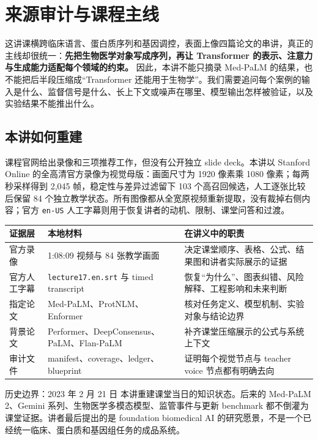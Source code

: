 \documentclass[a4paper]{article}
\begin{document}
\makecscover

\section{来源审计与课程主线}

这讲课横跨临床语言、蛋白质序列和基因调控，表面上像四篇论文的串讲，真正的主线却很统一：\textbf{先把生物医学对象写成序列，再让 Transformer 的表示、注意力与生成能力适配每个领域的约束。} 因此，本讲不能只摘录 Med-PaLM 的结果，也不能把后半段压缩成“Transformer 还能用于生物学”。我们需要追问每个案例的输入是什么、监督信号是什么、长上下文或噪声在哪里、模型输出怎样被验证，以及实验结果不能推出什么。

\subsection{本讲如何重建}

课程官网给出录像和三项推荐工作，但没有公开独立 slide deck。本讲以 Stanford Online 的全高清官方录像为视觉母版：画面尺寸为 1920 像素乘 1080 像素；每两秒采样得到 2,045 帧，稳定性与差异过滤留下 103 个高召回候选，人工逐张比较后保留 84 个独立教学状态。所有图像都从全宽原视频重新提取，没有裁掉右侧内容；官方 \texttt{en-US} 人工字幕则用于恢复讲者的动机、限制、课堂问答和过渡。

\begin{longtable}{@{}L{0.18\textwidth}L{0.28\textwidth}L{0.42\textwidth}@{}}
\toprule
证据层 & 本地材料 & 在讲义中的职责 \\
\midrule
官方录像 & 1:08:09 视频与 84 张教学画面 & 决定课堂顺序、表格、公式、结果图和讲者实际展示的证据 \\
官方人工字幕 & \texttt{lecture17.en.srt} 与 timed transcript & 恢复“为什么”、图表纠错、风险解释、工程影响和未来判断 \\
指定论文 & Med-PaLM、ProtNLM、Enformer & 核对任务定义、模型机制、实验对象与结论边界 \\
背景论文 & Performer、DeepConsensus、PaLM、Flan-PaLM & 补齐课堂压缩展示的公式与系统上下文 \\
审计文件 & manifest、coverage、ledger、blueprint & 证明每个视觉节点与 teacher voice 节点都有明确去向 \\
\bottomrule
\end{longtable}

\begin{warningbox}{历史边界：2023 年 2 月 21 日}
本讲重建课堂当日的知识状态。后来的 Med-PaLM 2、Gemini 系列、生物医学多模态模型、监管事件与更新 benchmark 都不倒灌为课堂证据。讲者最后提出的是 foundation biomedical AI 的研究愿景，不是一个已经统一临床、蛋白质和基因组任务的成品系统。
\end{warningbox}
\end{document}

